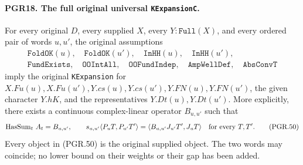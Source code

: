 \paragraph{PGR18. The full original universal \texttt{KExpansionC}.}
\label{claim:PGR18}
For every original \(D\), every supplied \(X\), every
\(Y:\texttt{Full}(X)\), and every ordered pair of words
\(u,u'\), the original assumptions
\[
 \begin{gathered}
 \texttt{FoldOK}(u),\quad\texttt{FoldOK}(u'),\quad
 \texttt{InHH}(u),\quad\texttt{InHH}(u'),\\
 \texttt{FundExists},\quad\texttt{OOIntAll},\quad
 \texttt{OOFundIndep},\quad\texttt{AmpWellDef},\quad
 \texttt{AbsConvT}
 \end{gathered}
\tag{PGR.49}
\]
imply the original \texttt{KExpansion} for
\(X.Fu(u),X.Fu(u'),Y.cs(u),Y.cs(u'),Y.FN(u),Y.FN(u')\),
the given character \(Y.hK\), and the representatives
\(Y.Dt(u),Y.Dt(u')\).  More explicitly, there exists a
continuous complex-linear operator \(B_{u,u'}\) such that
\[
 \operatorname{HasSum}_{t}\,A_t=B_{u,u'},\qquad
 s_{u,u'}\langle P_uT,P_{u'}T'\rangle
       =\langle B_{u,u'}J_{u'}T',J_uT\rangle
                                  \quad\hbox{for every }T,T'.
\tag{PGR.50}
\]
Every object in (PGR.50) is the original supplied object.  The two
words may coincide; no lower bound on their weights or their gap
has been added.
